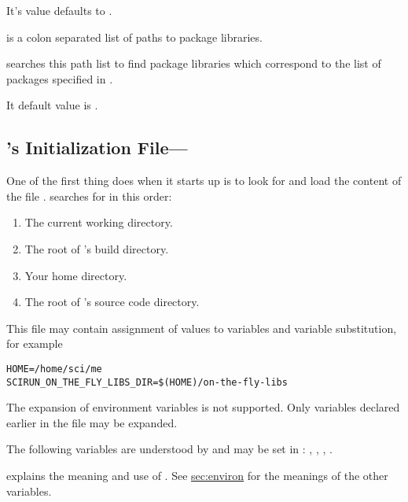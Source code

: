 \begin{description}
  It's value defaults to .

  
   is a colon separated list of paths to
  package libraries.
  
  \sr{} searches this path list to find package libraries
  which correspond to the list of packages specified in
  .
  
  It default value is .

  
\end{description}

\subsection{\sr{}'s Initialization File---}
\label{sec:scirunrc}

One of the first thing \sr{} does when it starts up is to look for and
load the content of the file .  \sr{} searches for
 in this order:

\begin{enumerate}
\item The current working directory.
\item The root of \sr's build directory.
\item Your home directory.
\item The root of \sr's source code directory.
\end{enumerate}

This file may contain assignment of values to variables and variable
substitution, for example

\begin{verbatim}
HOME=/home/sci/me
SCIRUN_ON_THE_FLY_LIBS_DIR=$(HOME)/on-the-fly-libs
\end{verbatim}

The expansion of environment variables is not supported.  Only
variables declared earlier in the file may be expanded.

The following variables are understood by \sr{} and may be set in
: ,
, ,
.

 explains the meaning and use
of .  See \hyperref{the
  previous section}{Section~}{}{sec:environ}
for the meanings of the other variables.

